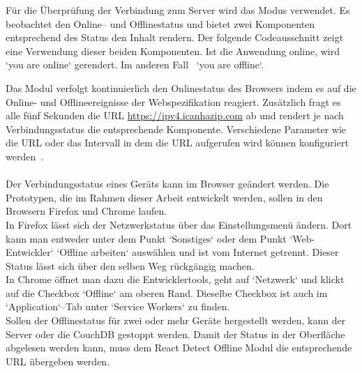 Für die Überprüfung der Verbindung zum Server wird das Modus  verwendet. Es beobachtet den Online-- und Offlinestatus und bietet zwei Komponenten entsprechend des Status den Inhalt rendern. Der folgende Codeausschnitt zeigt eine Verwendung dieser beiden Komponenten. Ist die Anwendung online, wird `you are online` gerendert. Im anderen Fall ~`you are offline`.
%
\begin{center}

\end{center}
%
Das Modul verfolgt kontinuierlich den Onlinestatus des Browsers indem es auf die Online- und Offlineereignisse der Webspezifikation reagiert. Zusätzlich fragt es alle fünf Sekunden die URL \url{https://ipv4.icanhazip.com} ab und rendert je nach Verbindungsstatus die entsprechende Komponente. Verschiedene Parameter wie die URL oder das Intervall in dem die URL aufgerufen wird können konfiguriert werden~\cite{react-detect}. \\\\
%
Der Verbindungsstatus eines Geräts kann im Browser geändert werden. Die Prototypen, die im Rahmen dieser Arbeit entwickelt werden, sollen in den Browsern Firefox und Chrome laufen.\\
In Firefox lässt sich der Netzwerkstatus über das Einstellungsmenü ändern. Dort kann man entweder unter dem Punkt `Sonstiges` oder dem Punkt `Web-Entwickler` `Offline arbeiten` auswählen und ist vom Internet getrennt. Dieser Status lässt sich über den selben Weg rückgängig machen.\\
In Chrome öffnet man dazu die Entwicklertools, geht auf `Netzwerk` und klickt auf die Checkbox `Offline` am oberen Rand. Dieselbe Checkbox ist auch im `Application`--Tab unter `Service Workers` zu finden.\\
Sollen der Offlinestatus für zwei oder mehr Geräte hergestellt werden, kann der Server oder die CouchDB gestoppt werden. Damit der Status in der Oberfläche abgelesen werden kann, muss dem React Detect Offline Modul die entsprechende URL übergeben werden.